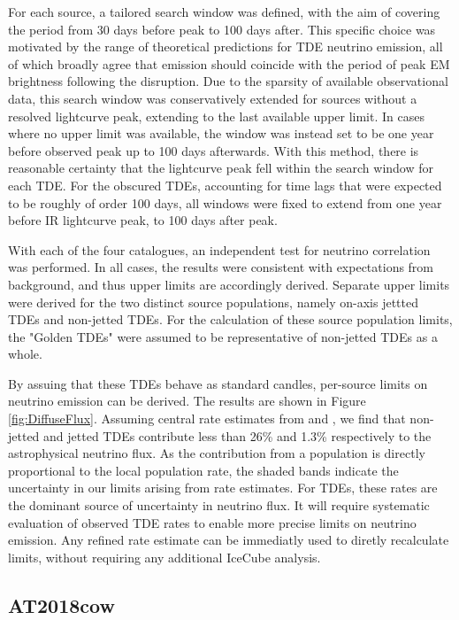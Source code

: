 \documentclass{PoS}
\begin{document}
For each source, a tailored search window was defined, with the aim of covering the period from 30 days before peak to 100 days after. This specific choice was motivated by the range of theoretical predictions for TDE neutrino emission, all of which broadly agree that emission should coincide with the period of peak EM brightness following the disruption. Due to the sparsity of available observational data, this search window was conservatively extended for sources without a resolved lightcurve peak, extending to the last available upper limit. In cases where no upper limit was available, the window was instead set to be one year before observed peak up to 100 days afterwards. With this method, there is reasonable certainty that the lightcurve peak fell within the search window for each TDE. For the obscured TDEs, accounting for time lags that were expected to be roughly of order 100 days, all windows were fixed to extend from one year before IR lightcurve peak, to 100 days after peak.

With each of the four catalogues, an independent test for neutrino correlation was performed. In all cases, the results were consistent with expectations from background, and thus upper limits are accordingly derived. Separate upper limits were derived for the two distinct source populations, namely on-axis jettted TDEs and non-jetted TDEs. For the calculation of these source population limits, the "Golden TDEs" were assumed to be representative of non-jetted TDEs as a whole. 

By assuing that these TDEs behave as standard candles, per-source limits on neutrino emission can be derived.  The results are shown in Figure \ref{fig:DiffuseFlux}. Assuming central rate estimates from \cite{vanVelzen:2017qum} and \cite{Sun:2015bda}, we find that non-jetted and jetted TDEs contribute less than 26\% and 1.3\% respectively to the astrophysical neutrino flux. As the contribution from a population is directly proportional to the local population rate, the shaded bands indicate the uncertainty in our limits arising from rate estimates. For TDEs, these rates are the dominant source of uncertainty in neutrino flux. It will require systematic evaluation of observed TDE rates to enable more precise limits on neutrino emission. Any refined rate estimate can be immediatly used to diretly recalculate  limits, without requiring any additional IceCube analysis.

\subsection{AT2018cow}
\end{document}
